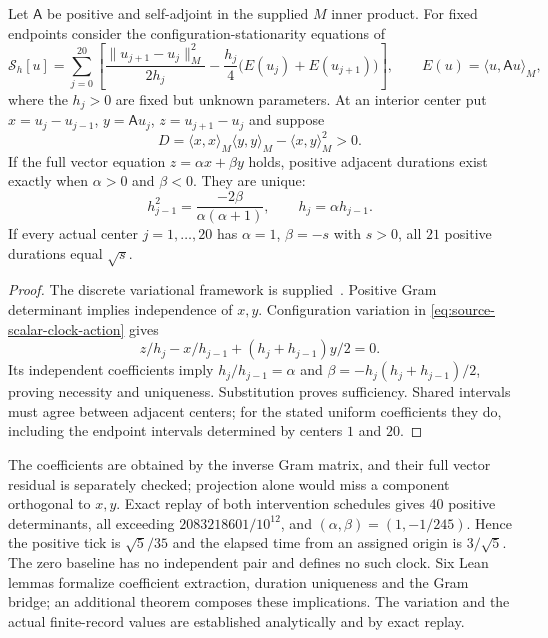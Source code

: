 \begin{proposition}
\label{prop:source-scalar-clock-unique}
Let $\mathsf A$ be positive and self-adjoint in the supplied $M$ inner product.
For fixed endpoints consider the configuration-stationarity equations of
\begin{equation}
 \mathcal S_h[u]=\sum_{j=0}^{20}\left[
  \frac{\|u_{j+1}-u_j\|_M^2}{2h_j}
  -\frac{h_j}{4}\bigl(E(u_j)+E(u_{j+1})\bigr)\right],
 \qquad E(u)=\langle u,\mathsf A u\rangle_M,
 \label{eq:source-scalar-clock-action}
\end{equation}
where the $h_j>0$ are fixed but unknown parameters. At an interior center put
$x=u_j-u_{j-1}$, $y=\mathsf A u_j$, $z=u_{j+1}-u_j$ and suppose
\[
 D=\langle x,x\rangle_M\langle y,y\rangle_M
       -\langle x,y\rangle_M^2>0.
\]
If the full vector equation $z=\alpha x+\beta y$ holds, positive adjacent
durations exist exactly when $\alpha>0$ and $\beta<0$. They are unique:
\begin{equation}
 h_{j-1}^2=\frac{-2\beta}{\alpha(\alpha+1)},\qquad
 h_j=\alpha h_{j-1}.
 \label{eq:source-scalar-clock-duration}
\end{equation}
If every actual center $j=1,\ldots,20$ has $\alpha=1$, $\beta=-s$ with
$s>0$, all $21$ positive durations equal $\sqrt{s}$.
\end{proposition}
\begin{proof}
The discrete variational framework is supplied~\cite{marsdenWest}.
Positive Gram determinant implies independence of $x,y$. Configuration
variation in \eqref{eq:source-scalar-clock-action} gives
\[
 z/h_j-x/h_{j-1}+(h_j+h_{j-1})y/2=0.
\]
Its independent coefficients imply $h_j/h_{j-1}=\alpha$ and
$\beta=-h_j(h_j+h_{j-1})/2$, proving necessity and uniqueness.
Substitution proves sufficiency. Shared intervals must agree between
adjacent centers; for the stated uniform coefficients they do, including
the endpoint intervals determined by centers $1$ and $20$.
\end{proof}

The coefficients are obtained by the inverse Gram matrix, and their full
vector residual is separately checked; projection alone would miss a
component orthogonal to $x,y$. Exact replay of both intervention schedules
gives $40$ positive determinants, all exceeding $2083218601/10^{12}$,
and $(\alpha,\beta)=(1,-1/245)$. Hence the positive tick is $\sqrt5/35$
and the elapsed time from an assigned origin is $3/\sqrt5$. The zero
baseline has no independent pair and defines no such clock. Six Lean lemmas
formalize coefficient extraction, duration uniqueness and the Gram bridge;
an additional theorem composes these implications. The variation and the
actual finite-record values are established analytically and by exact replay.


